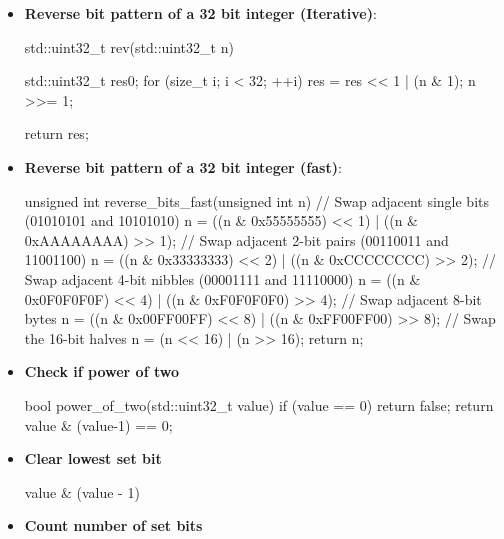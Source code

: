 \documentclass{report}
\begin{document}
    \begin{itemize}
        \item \textbf{Reverse bit pattern of a 32 bit integer (Iterative)}:  
            \bigbreak \noindent 
            \begin{cppcode}
                std::uint32_t rev(std::uint32_t n) {
                    std::uint32_t res{0}; 
                    for (size_t i{}; i < 32; ++i) {
                        res = res << 1 | (n & 1);
                        n >>= 1;
                    }

                    return res;
                }
            \end{cppcode}
        \item \textbf{Reverse bit pattern of a 32 bit integer (fast)}:
            \bigbreak \noindent 
            \begin{cppcode}
                unsigned int reverse_bits_fast(unsigned int n) {
                    // Swap adjacent single bits (01010101 and 10101010)
                    n = ((n & 0x55555555) << 1) | ((n & 0xAAAAAAAA) >> 1);
                    // Swap adjacent 2-bit pairs (00110011 and 11001100)
                    n = ((n & 0x33333333) << 2) | ((n & 0xCCCCCCCC) >> 2);
                    // Swap adjacent 4-bit nibbles (00001111 and 11110000)
                    n = ((n & 0x0F0F0F0F) << 4) | ((n & 0xF0F0F0F0) >> 4);
                    // Swap adjacent 8-bit bytes
                    n = ((n & 0x00FF00FF) << 8) | ((n & 0xFF00FF00) >> 8);
                    // Swap the 16-bit halves
                    n = (n << 16) | (n >> 16);
                    return n;
                }
            \end{cppcode}
        \item \textbf{Check if power of two}
            \bigbreak \noindent 
            \begin{cppcode}
                bool power_of_two(std::uint32_t value) {
                    if (value == 0) return false;
                    return value & (value-1) == 0;
                }
            \end{cppcode}
        \item \textbf{Clear lowest set bit}
            \bigbreak \noindent 
            \begin{cppcode}
                value & (value - 1)
            \end{cppcode}
        \item \textbf{Count number of set bits}
            \bigbreak \noindent 
            \begin{cppcode}

\end{cppcode}
\end{itemize}
\end{document}
